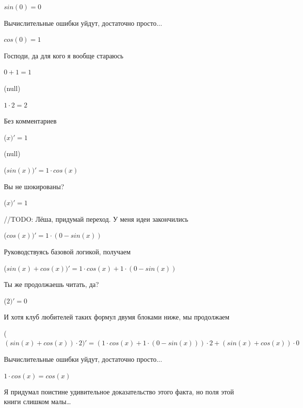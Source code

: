 \documentclass[12pt,a4paper,fleqn]{article}
\begin{document}
\begin{center}
\begin{center}$sin(0) = 0$\end{center}
Вычислительные ошибки уйдут, достаточно просто...

\begin{center}
\begin{center}$cos(0) = 1$\end{center}
Господи, да для кого я вообще стараюсь

\begin{center}
\begin{center}$0+1 = 1$\end{center}
(null)\cite{link4}

\begin{center}
\begin{center}$1 \cdot 2 = 2$\end{center}
Без комментариев\cite{link4}

\begin{center}
 ($x)'
  = 1$\end{center}
(null)\cite{link4}

\begin{center}
 ($sin(x))'
  = 1 \cdot cos(x)$\end{center}
Вы не шокированы?\cite{link3}

\begin{center}
 ($x)'
  = 1$\end{center}
//TODO: Лёша, придумай переход. У меня идеи закончились

\begin{center}
 ($cos(x))'
  = 1 \cdot (0-sin(x))$\end{center}
Руководствуясь базовой логикой, получаем

\begin{center}
 ($sin(x)+cos(x))'
  = 1 \cdot cos(x)+1 \cdot (0-sin(x))$\end{center}
Ты же продолжаешь читать, да?

\begin{center}
 ($2)'
  = 0$\end{center}
И хотя клуб любителей таких формул двумя блоками ниже, мы продолжаем

\begin{center}
 ($(sin(x)+cos(x)) \cdot 2)'
  = (1 \cdot cos(x)+1 \cdot (0-sin(x))) \cdot 2+(sin(x)+cos(x)) \cdot 0$\end{center}
Вычислительные ошибки уйдут, достаточно просто...

\begin{center}
$1 \cdot cos(x) = cos(x)$\end{center}
Я придумал поистине удивительное доказательство этого факта, но поля этой книги слишком малы\ldots


\end{center}
\end{center}
\end{center}
\end{center}
\end{document}
